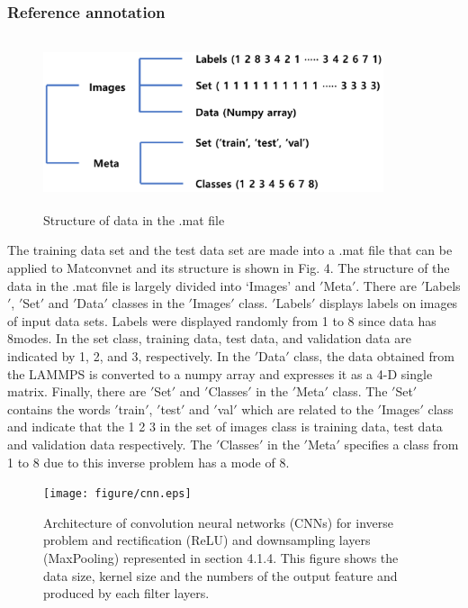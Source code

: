 \subsubsection{Reference annotation}
\label{subsubsec2}

\begin{figure}
\includegraphics[width=10cm, height=5cm]{figure/label.eps}
\caption{Structure of data in the .mat file}
\label{fig:4}       
\end{figure}
The training data set and the test data set are made into a .mat file that can be applied to Matconvnet and its structure is shown in Fig. 4. The structure of the data in the .mat file is largely divided into `Images' and $'$Meta$'$. There are $'$Labels$'$, $'$Set$'$ and $'$Data$'$ classes in the $'$Images$'$ class. $'$Labels$'$ displays labels on images of input data sets. Labels were displayed randomly from 1 to 8 since data has 8modes. In the set class, training data, test data, and validation data are indicated by 1, 2, and 3, respectively. In the $'$Data$'$ class, the data obtained from the LAMMPS is converted to a numpy array and expresses it as a 4-D single matrix. Finally, there are $'$Set$'$ and $'$Classes$'$ in the $'$Meta$'$ class. The $'$Set$'$ contains the words $'$train$'$, $'$test$'$ and $'$val$'$ which are related to the $'$Images$'$ class and indicate that the 1 2 3 in the set of images class is training data, test data and validation data respectively. The $'$Classes$'$ in the $'$Meta$'$ specifies a class from 1 to 8 due to this inverse problem has a mode of 8.
\begin{figure}
\texttt{[image: figure/cnn.eps]}
\caption{Architecture of convolution neural networks (CNNs) for inverse problem and rectification (ReLU) and downsampling layers (MaxPooling) represented in section 4.1.4. This figure shows the data size, kernel size and the numbers of the output feature and produced by each filter layers.}
\label{fig:5}       
\end{figure}
